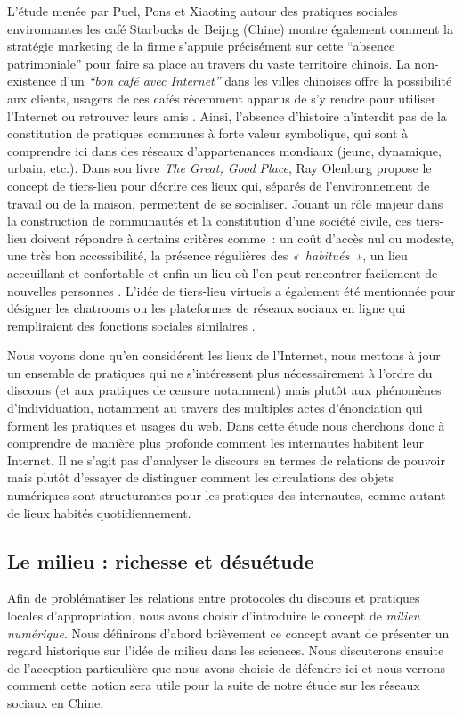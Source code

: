 L’étude menée par Puel, Pons et Xiaoting autour des pratiques sociales environnantes les café Starbucks de Beijng (Chine) montre également comment la stratégie marketing de la firme s’appuie précisément sur cette “absence patrimoniale” pour faire sa place au travers du vaste territoire chinois. La non-existence d’un \textit{“bon café avec Internet”} dans les villes chinoises offre la possibilité aux clients, usagers de ces cafés récemment apparus de s’y rendre pour utiliser l’Internet ou retrouver leurs amis \citep{Puel2007}. Ainsi, l’absence d’histoire n’interdit pas de la constitution de pratiques communes à forte valeur symbolique, qui sont à comprendre ici dans des réseaux d’appartenances mondiaux (jeune, dynamique, urbain, etc.). Dans son livre \textit{The Great, Good Place}, Ray Olenburg propose le concept de tiers-lieu pour décrire ces lieux qui, séparés de l’environnement de travail ou de la maison, permettent de se socialiser. Jouant un rôle majeur dans la construction de communautés et la constitution d’une société civile, ces tiers-lieu doivent répondre à certains critères comme : un coût d’accès nul ou modeste, une très bon accessibilité, la présence régulières des \textit{« habitués »}, un lieu acceuillant et confortable et enfin un lieu où l’on peut rencontrer facilement de nouvelles personnes \citep{Oldenburg1999}. L’idée de tiers-lieu virtuels a également été mentionnée pour désigner les chatrooms ou les plateformes de réseaux sociaux en ligne qui rempliraient des fonctions sociales similaires \citep{Soukup2006}. 

Nous voyons donc qu’en considérent les lieux de l’Internet, nous mettons à jour un ensemble de pratiques qui ne s’intéressent plus nécessairement à l’ordre du discours (et aux pratiques de censure notamment) mais plutôt aux phénomènes d’individuation, notamment au travers des multiples actes d’énonciation qui forment les pratiques et usages du web. Dans cette étude nous cherchons donc à comprendre de manière plus profonde comment les internautes habitent leur Internet. Il ne s’agit pas d’analyser le discours en termes de relations de pouvoir mais plutôt d’essayer de distinguer comment les circulations des objets numériques sont structurantes pour les pratiques des internautes, comme autant de lieux habités quotidiennement.

\subsection[Le milieu : richesse et désuétude ]{Le milieu : richesse et désuétude }
Afin de problématiser les relations entre protocoles du discours et pratiques locales d’appropriation, nous avons choisir d’introduire le concept de \textit{milieu numérique}. Nous définirons d’abord brièvement ce concept avant de présenter un regard historique sur l’idée de milieu dans les sciences. Nous discuterons ensuite de l’acception particulière que nous avons choisie de défendre ici et nous verrons comment cette notion sera utile pour la suite de notre étude sur les réseaux sociaux en Chine.

